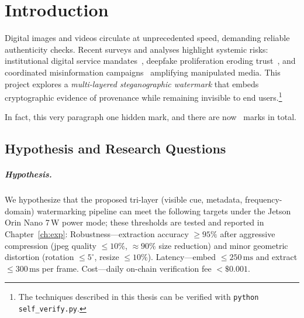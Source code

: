 \chapter{Introduction}
\label{ch:intro}

\newcommand{\wmTotal}{\textbf{\arabic{wmcount}}}

\begin{overview}
    Digital images and videos circulate at unprecedented speed, demanding
    reliable authenticity checks.
    Recent surveys and analyses highlight
    systemic risks: institutional digital service mandates~\cite{ministereDSI2024},
    deepfake proliferation eroding trust~\cite{smith2023deepfakes}, and
    coordinated misinformation campaigns~\cite{doe2024misinfo} amplifying
    manipulated media.
    This project explores a
    \emph{multi-layered steganographic watermark} that embeds cryptographic
    evidence of provenance while remaining invisible to end users.\footnote{%
        The techniques described in this thesis can be verified with
        \texttt{python self\_verify.py}.}

    In fact, this very paragraph  one hidden mark, and
    there are now \wmTotal\ marks in total.
\end{overview}

\chapterdivider

\section{Hypothesis and Research Questions}
\label{sec:intro:hypothesis}

\paragraph{Hypothesis.} We hypothesize that the proposed tri-layer (visible cue, metadata, frequency-domain) watermarking pipeline can meet the following targets under the Jetson Orin Nano 7\,W power mode; these thresholds are tested and reported in Chapter~\ref{ch:exp}: Robustness—extraction accuracy $\ge 95\%$ after aggressive compression (\gls{jpeg} quality $\le 10\%$, $\approx 90\%$ size reduction) and minor geometric distortion (rotation $\le 5^{\circ}$, resize $\le 10\%$). Latency—embed $\le 250\,\mathrm{ms}$ and extract $\le 300\,\mathrm{ms}$ per frame. Cost—daily on-chain verification fee $<\$0.001$.

